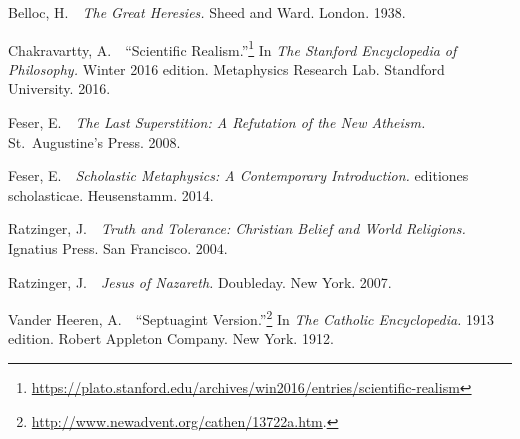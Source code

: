 \documentclass[twocolumn]{article}
\begin{document}
\begin{thebibliography}{}

      Belloc, H.\ \ {\it The Great Heresies.}  Sheed and Ward.  London.  1938.

      Chakravartty, A.\ \ ``Scientific Realism.''\footnote{%
         \url{https://plato.stanford.edu/archives/win2016/entries/scientific-realism}%
      }
      In {\it The Stanford Encyclopedia of Philosophy.}  Winter 2016 edition.
      Metaphysics Research Lab.  Standford University.  2016.

      Feser, E.\ \ {\it The Last Superstition: A Refutation of the New
      Atheism.}  St.~Augustine's Press.  2008.

      Feser, E.\ \ {\it Scholastic Metaphysics: A Contemporary Introduction.}
      editiones scholasticae.  Heusenstamm.  2014.

      Ratzinger, J.\ \ {\it Truth and Tolerance: Christian Belief and World
      Religions.}  Ignatius Press.  San Francisco.  2004.

      Ratzinger, J.\ \ {\it Jesus of Nazareth.}  Doubleday.  New York.  2007.

      Vander Heeren, A.\ \ ``Septuagint Version.''\footnote{%
         \url{http://www.newadvent.org/cathen/13722a.htm}.
      }
      In {\it The Catholic Encyclopedia.}  1913 edition.  Robert Appleton
      Company.  New York.  1912.

\end{thebibliography}
\end{document}
